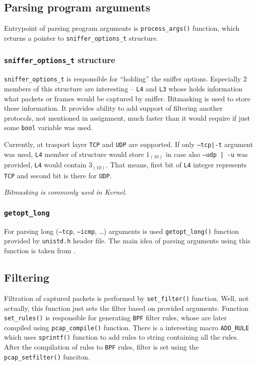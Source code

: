 \documentclass[11pt, a4paper]{article}
\begin{document}
        \subsection{Parsing program arguments}
            Entrypoint of parsing program arguments is \texttt{process\_args()} function, which returns a pointer to \linebreak\texttt{sniffer\_options\_t} structure.
            \subsubsection{\texttt{sniffer\_options\_t} structure}
                \texttt{sniffer\_options\_t} is responsible for ``holding'' the sniffer options.
                Especially 2 members of this structure are interesting -- \texttt{L4} and \texttt{L3} whose holds information what packets or frames would be captured by sniffer.
                Bitmasking\cite{masking} is used to store these information. It provides ability to add support of filtering another protocols, not mentioned in assignment, much faster than it would require if just some \texttt{bool} variable was used. 
                
                Currently, at trasport layer \texttt{TCP}\cite{tcprfc} and \texttt{UDP}\cite{udprfc} are supported.
                If only \texttt{--tcp|-t} argument was used, \texttt{L4} member of structure would store $1_{(10)}$ in case also \texttt{--udp | -u} was provided, \texttt{L4} would contain $3_{(10)}$. That means, first bit of \texttt{L4} integer represents \texttt{TCP} and second bit is there for \texttt{UDP}.
                
                \textit{Bitmasking is commonly used in Kernel.}
            \subsubsection{\texttt{getopt\_long}}
                For parsing long (\texttt{--tcp}, \texttt{--icmp}, \dots) arguments  is used \texttt{getopt\_long()} function provided by \texttt{unistd.h} header file.
                The main idea of parsing arguments using this function is taken from \cite{die}.
        
        \subsection{Filtering}
            Filtration of captured packets is performed by \texttt{set\_filter()} function. Well, not actually, this function just sets the filter based on provided arguments.
            Function \texttt{set\_rules()} is responsible for generating \texttt{BPF} filter rules, whose are later compiled using \texttt{pcap\_compile()} function. There is a interesting macro \texttt{ADD\_RULE} which uses \texttt{sprintf()} function to add rules to string containing all the rules. After the compilation of rules to \texttt{BPF} rules, filter is set using the \texttt{pcap\_setfilter()} funciton.
            
\end{document}

